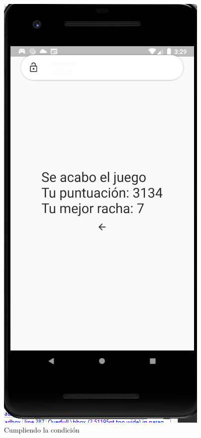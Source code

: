 \documentclass{article}
\begin{document}
\begin{figure}[H]
    \centering
    \includegraphics[scale=0.8]{imgs/Test/LogroDes}
    \caption{Cumpliendo la condición}
    \label{fig:pruebas_02}
\end{figure}
\end{document}
